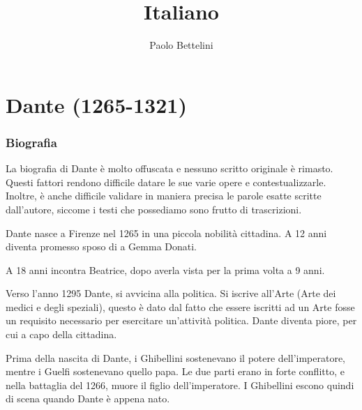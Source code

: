 \documentclass[a4paper]{article}
\title{Italiano}
\author{Paolo Bettelini}
\date{}
\begin{document}
\maketitle
\tableofcontents
\pagebreak








\part{Dante (1265-1321)}

\section{Biografia}

La biografia di Dante è molto offuscata e nessuno scritto originale è rimasto.
Questi fattori rendono difficile datare le sue varie opere e contestualizzarle. Inoltre,
è anche difficile validare in maniera precisa le parole esatte scritte dall'autore, siccome i testi che possediamo
sono frutto di trascrizioni.

Dante nasce a Firenze nel 1265 in una piccola nobilità cittadina.
A 12 anni diventa promesso sposo di a Gemma Donati.

A 18 anni incontra Beatrice, dopo averla vista per la prima volta a 9 anni.

Verso l'anno 1295 Dante, si avvicina alla politica.
Si iscrive all'Arte (Arte dei medici e degli speziali), questo è dato dal fatto che essere iscritti ad un Arte
fosse un requisito necessario per esercitare un'attività politica. Dante diventa piore, per cui a capo della cittadina. %

Prima della nascita di Dante, i Ghibellini sostenevano il potere dell'imperatore, mentre i Guelfi sostenevano quello papa.
Le due parti erano in forte conflitto, e nella battaglia del 1266, muore il figlio dell'imperatore.
I Ghibellini escono quindi di scena quando Dante è appena nato.
\end{document}
